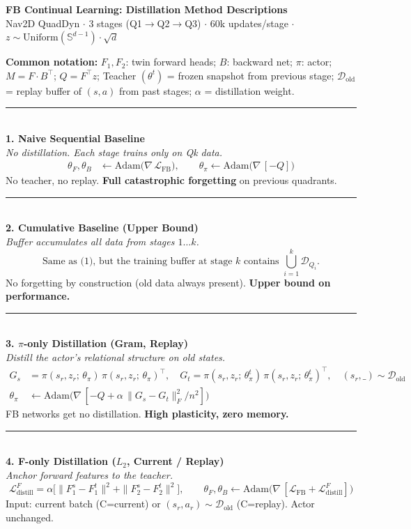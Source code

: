 \documentclass[10pt]{article}
\newcommand{\loss}{\mathcal{L}}
\newcommand{\Dold}{\mathcal{D}_{\text{old}}}
\newcommand{\method}[2]{%
  \noindent\rule{\textwidth}{0.5pt}\\[2pt]
  {\large\textbf{#1}}\\[2pt]
  \textit{#2}\\[4pt]
}
\begin{document}
\begin{center}
{\Large\textbf{FB Continual Learning: Distillation Method Descriptions}}\\[4pt]
{\small Nav2D QuadDyn $\cdot$ 3 stages (Q1$\to$Q2$\to$Q3) $\cdot$ 60k updates/stage $\cdot$ $z \sim \mathrm{Uniform}(\mathbb{S}^{d-1})\cdot\sqrt{d}$}
\end{center}

\noindent\textbf{Common notation:}\;
$F_1, F_2$: twin forward heads;\;
$B$: backward net;\;
$\pi$: actor;\;
$M = F \cdot B^\top$;\;
$Q = F^\top z$;\;
Teacher $(\theta^t)$ = frozen snapshot from previous stage;\;
$\Dold$ = replay buffer of $(s,a)$ from past stages;\;
$\alpha$ = distillation weight.

\method{1. Naive Sequential Baseline}{No distillation. Each stage trains only on Qk data.}
\vspace{-0.5em}
\begin{align*}
\theta_F, \theta_B &\leftarrow \mathrm{Adam}\bigl(\nabla\,\loss_{\text{FB}}\bigr), \qquad
\theta_\pi \leftarrow \mathrm{Adam}\bigl(\nabla\,[-Q]\bigr)
\end{align*}
No teacher, no replay. \textbf{Full catastrophic forgetting} on previous quadrants.

\method{2. Cumulative Baseline (Upper Bound)}{Buffer accumulates all data from stages $1 \ldots k$.}
\vspace{-0.5em}
\[
\text{Same as (1), but the training buffer at stage } k \text{ contains } \bigcup_{i=1}^{k} \mathcal{D}_{Q_i}.
\]
No forgetting by construction (old data always present). \textbf{Upper bound on performance.}

\method{3. $\pi$-only Distillation (Gram, Replay)}{Distill the actor's relational structure on old states.}
\vspace{-0.5em}
\begin{align*}
G_s &= \pi(s_r, z_r;\,\theta_\pi)\,\pi(s_r, z_r;\,\theta_\pi)^\top, \quad
G_t = \pi(s_r, z_r;\,\theta_\pi^t)\,\pi(s_r, z_r;\,\theta_\pi^t)^\top, \quad (s_r, \_) \sim \Dold\\[3pt]
\theta_\pi &\leftarrow \mathrm{Adam}\bigl(\nabla\,[-Q + \alpha\,\|G_s - G_t\|_F^2 / n^2]\bigr)
\end{align*}
FB networks get no distillation. \textbf{High plasticity, zero memory.}

\method{4. F-only Distillation ($L_2$, Current / Replay)}{Anchor forward features to the teacher.}
\vspace{-0.5em}
\[
\loss_{\text{distill}}^{F} = \alpha\bigl[\|F_1^s - F_1^t\|^2 + \|F_2^s - F_2^t\|^2\bigr], \qquad
\theta_F, \theta_B \leftarrow \mathrm{Adam}\bigl(\nabla\,[\loss_{\text{FB}} + \loss_{\text{distill}}^{F}]\bigr)
\]
Input: current batch (C=current) or $(s_r, a_r) \sim \Dold$ (C=replay). Actor unchanged.
\end{document}
